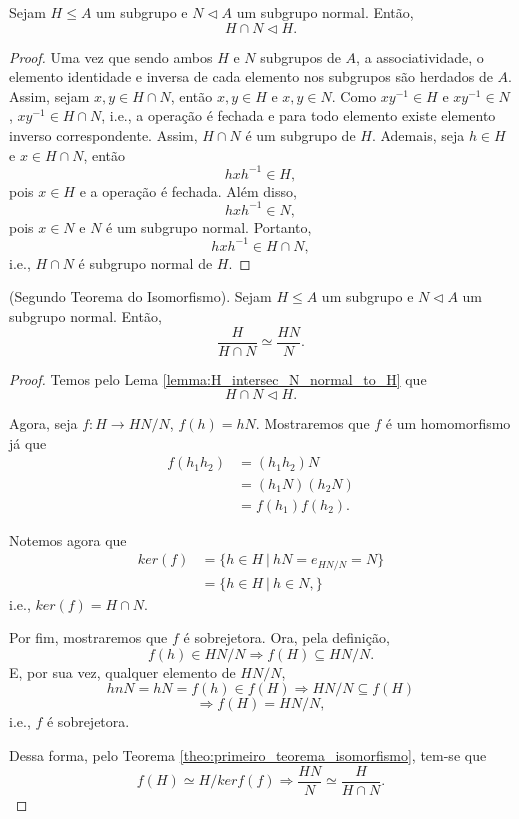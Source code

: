 \documentclass[11pt,openany]{book}
\begin{document}
    \begin{lemma}
    \label{lemma:H_intersec_N_normal_to_H}
        Sejam $H \leq A$ um subgrupo e $N \triangleleft A$ um subgrupo normal. Então,
    \[{H \cap N} \triangleleft H.\]
    \end{lemma}
    \begin{proof}
        Uma vez que sendo ambos $H$ e $N$ subgrupos de $A$, a associatividade, o elemento identidade e inversa de cada elemento nos subgrupos são herdados de $A$. Assim, sejam $x, y \in H \cap N$, então $x, y \in H$ e $x, y \in N$. Como $xy^{-1} \in H$ e $xy^{-1} \in N$, $xy^{-1} \in H \cap N$, i.e., a operação é fechada e para todo elemento existe elemento inverso correspondente. Assim, $H \cap N$ é um subgrupo de $H$. Ademais, seja $h \in H$ e $x \in H \cap N$, então
        \[hxh^{-1} \in H,\]
        pois $x \in H$ e a operação é fechada. Além disso,
        \[hxh^{-1} \in N,\]
        pois $x \in N$ e $N$ é um subgrupo normal.
        Portanto,
        \[hxh^{-1} \in H \cap N,\]
        i.e., $H \cap N$ é subgrupo normal de $H$.
    \end{proof}

    \begin{theorem}
    \label{theo:segundo_teorema_isomorfismo}
    (Segundo Teorema do Isomorfismo). Sejam $H \leq A$ um subgrupo e $N \triangleleft A$ um subgrupo normal. Então,
    \[\frac{H}{H \cap N} \simeq \frac{HN}{N}.\]
    \end{theorem}
    
    \begin{proof}
    Temos pelo Lema \ref{lemma:H_intersec_N_normal_to_H} que
    \[H \cap N \triangleleft H.\]
    
    Agora, seja $f:H \rightarrow HN/N$, $f(h) = hN$. Mostraremos que $f$ é um homomorfismo já que
    \begin{align*}
        f(h_1h_2) &= (h_1h_2)N \\
        &= (h_1N)(h_2N) \\
        &= f(h_1)f(h_2).
    \end{align*}

    Notemos agora que
    \begin{align*}
        ker(f) &= \{h \in H \ | \ hN = e_{HN/N} = N\} \\
        &= \{h \in H \ | \ h \in N,\}
    \end{align*}
    i.e., $ker(f) = H \cap N$.

    Por fim, mostraremos que $f$ é sobrejetora. Ora, pela definição,
    \[f(h) \in HN/N \Rightarrow f(H) \subseteq HN/N.\]
    E, por sua vez, qualquer elemento de $HN/N$,
    \[hnN = hN = f(h) \in f(H) \Rightarrow HN/N \subseteq f(H)\]
    \[\Rightarrow f(H) = HN/N,\]
    i.e., $f$ é sobrejetora.

    Dessa forma, pelo Teorema \ref{theo:primeiro_teorema_isomorfismo}, tem-se que
    \[f(H) \simeq H/kerf(f) \Rightarrow \frac{HN}{N} \simeq \frac{H}{H \cap N}.\]
    \end{proof}
\end{document}
